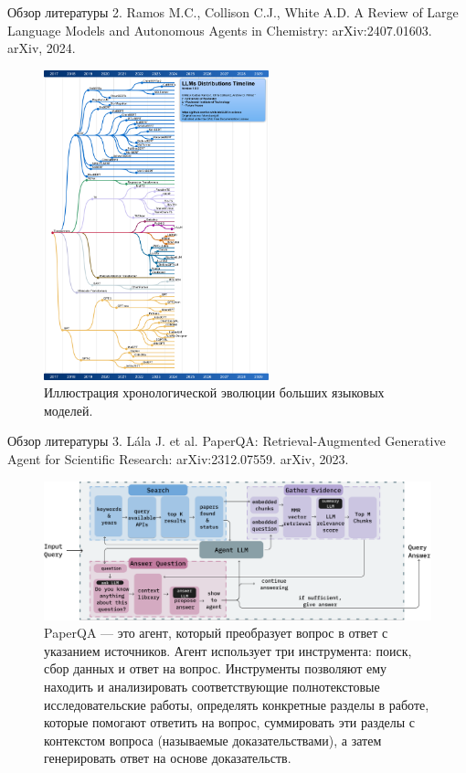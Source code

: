 \documentclass{beamer}
\begin{document}
	\begin{frame}{Обзор литературы}
		{\scriptsize2. Ramos M.C., Collison C.J., White A.D. A Review of Large Language Models and Autonomous Agents in Chemistry: arXiv:2407.01603. arXiv, 2024.}
		
		\begin{figure}
			\centering
			\includegraphics[width=0.58\textwidth, angle=90]{images/llm_ldt.png}
			\caption[pt9]{Иллюстрация хронологической эволюции больших языковых моделей.}
			\label{fig: llm_ldt}
		\end{figure}
		

	\end{frame}
	
	\begin{frame}{Обзор литературы}
		{\scriptsize 3. Lála J. et al. PaperQA: Retrieval-Augmented Generative Agent for Scientific Research: arXiv:2312.07559. arXiv, 2023.}
		\begin{figure}
	
	
	\centering
	\includegraphics[width=1\textwidth]{images/PaperQA_Workflow_Diagram}
	\caption{PaperQA — это агент, который преобразует вопрос в ответ с указанием источников. Агент использует три инструмента: поиск, сбор данных и ответ на вопрос. Инструменты позволяют ему находить и анализировать соответствующие полнотекстовые исследовательские работы, определять конкретные разделы в работе, которые помогают ответить на вопрос, суммировать эти разделы с контекстом вопроса (называемые доказательствами), а затем генерировать ответ на основе доказательств.}
	\label{fig:paperqaworkflowdiagram}
		\end{figure}
		
		
	\end{frame}
	
\end{document}
